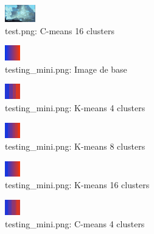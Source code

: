 \documentclass{article}
\begin{document}
  \begin{figure}[h]
    \centering
    \includegraphics[scale=6]{images/result_test_c_16.png}
    \caption{test.png: C-means 16 clusters}
    \label{fig:}
  \end{figure}



  \begin{figure}[h]
    \centering
    \includegraphics[scale=8]{images/testing_mini.png}
    \caption{testing\_mini.png: Image de base}
    \label{fig:}
  \end{figure}

  \begin{figure}[h]
    \centering
    \includegraphics[scale=6]{images/result_testing_mini_k_4.png}
    \caption{testing\_mini.png: K-means 4 clusters}
    \label{fig:}
  \end{figure}

  \begin{figure}[h]
    \centering
    \includegraphics[scale=6]{images/result_testing_mini_k_8.png}
    \caption{testing\_mini.png: K-means 8 clusters}
    \label{fig:}
  \end{figure}

  \begin{figure}[h]
    \centering
    \includegraphics[scale=6]{images/result_testing_mini_k_16.png}
    \caption{testing\_mini.png: K-means 16 clusters}
    \label{fig:}
  \end{figure}

  \begin{figure}[h]
    \centering
    \includegraphics[scale=6]{images/result_testing_mini_c_4.png}
    \caption{testing\_mini.png: C-means 4 clusters}
    \label{fig:}
  \end{figure}
\end{document}
